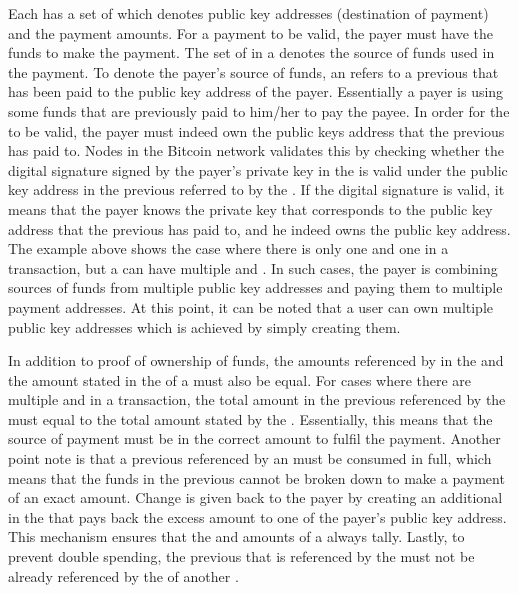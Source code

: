 Each \kwTransaction{}{} has a set of  which denotes public key addresses (destination of payment) and the payment amounts. For a payment to be valid, the payer must have the funds to make the payment.  The set of  in a \kwTransaction{}{} denotes the source of funds used in the payment. To denote the payer’s source of funds, an \kwInput{} refers to a previous \kwOutput{} that has been paid to the public key address of the payer. Essentially a payer is using some funds that are previously paid to him/her to pay the payee. In order for the \kwTransaction{}{} to be valid, the payer must indeed own the public keys address that the previous \kwOutput{} has paid to. Nodes in the Bitcoin network validates this by checking whether the digital signature signed by the payer’s private key in the \kwInput{} is valid under the public key address in the previous \kwOutput{} referred to by the \kwInput{}. If the digital signature is valid, it means that the payer knows the private key that corresponds to the public key address that the previous \kwOutput{} has paid to, and he indeed owns the public key address. The example above shows the case where there is only one \kwInput{} and one \kwOutput{} in a transaction, but a \kwTransaction{}{} can have multiple  and . In such cases, the payer is combining sources of funds from multiple public key addresses and paying them to multiple payment addresses. At this point, it can be noted that a user can own multiple public key addresses which is achieved by simply creating them.

In addition to proof of ownership of funds, the amounts referenced by in the \kwInput{} and the amount stated in the \kwOutput{} of a \kwTransaction{}{} must also be equal. For cases where there are multiple  and  in a transaction, the total amount in the previous  referenced by the  must equal to the total amount stated by the . Essentially, this means that the source of payment must be in the correct amount to fulfil the payment. Another point note is that a previous \kwOutput{} referenced by an \kwInput{} must be consumed in full, which means that the funds in the previous \kwOutput{} cannot be broken down to make a payment of an exact amount. Change is given back to the payer by creating an additional \kwOutput{} in the \kwTransaction{}{} that pays back the excess amount to one of the payer’s public key address. This mechanism ensures that the \kwInput{} and \kwOutput{} amounts of a \kwTransaction{}{} always tally. Lastly, to prevent double spending, the previous \kwOutput{} that is referenced by the \kwInput{} must not be already referenced by the \kwInput{} of another \kwTransaction{}{}.

